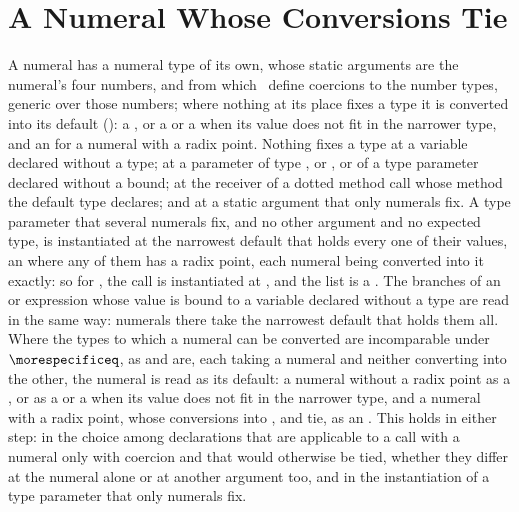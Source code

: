 \section{A Numeral Whose Conversions Tie}

A numeral has a numeral type of its own, whose static arguments are the
numeral's four numbers, and from which \library\ define coercions to the number
types, generic over those numbers; where nothing at its place fixes a type it is
converted into its default (): a , or a  or
a  when its value does not fit in the narrower type, and an
 for a numeral with a radix point.
Nothing fixes a type at a variable declared without a type; at a parameter of
type ,  or , or of a type parameter declared
without a bound; at the receiver of a dotted method call whose method the
default type declares; and at a static argument that only numerals fix.
A type parameter that several numerals fix, and no other argument and no
expected type, is instantiated at the narrowest default that holds every one of
their values, an  where any of them has a radix point, each
numeral being converted into it exactly: so for
, the call
 is instantiated at , and the
list  is a
.
The branches of an  or  expression whose value is bound to a
variable declared without a type are read in the same way: numerals there take
the narrowest default that holds them all.
Where the types to which a numeral can be converted are incomparable under
$\morespecificeq$, as  and  are, each
taking a numeral and neither converting into the other, the numeral is read as
its default: a numeral without a radix point as a , or as a
 or a  when its value does not fit in the
narrower type, and a numeral with a radix point, whose conversions into
,  and  tie, as an
.
This holds in either step: in the choice among declarations that are applicable
to a call with a numeral only with coercion and that would otherwise be tied,
whether they differ at the numeral alone or at another argument too,
and in the instantiation of a type parameter that only numerals fix.
